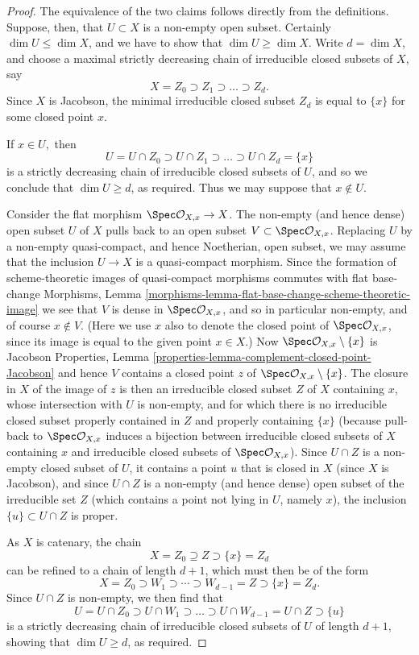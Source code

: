 \begin{proof}
The equivalence of the two claims follows directly from the
definitions.   Suppose, then, that $U\subset X$ is a non-empty open
subset.
Certainly $\dim U \leq \dim X$, and we have to show
that $\dim U \geq \dim X.$
Write $d = \dim X$, and choose a maximal strictly
decreasing chain of irreducible closed subsets
of $X$, say
$$
X = Z_0 \supset Z_1 \supset \dots \supset Z_d.
$$
Since $X$ is Jacobson, the minimal irreducible closed
subset $Z_d$ is equal to $\{x\}$ for some closed
point $x$.

\medskip\noindent
If $x \in U,$ then
$$
U = U \cap Z_0  \supset U\cap Z_1 \supset \dots \supset
U\cap Z_d = \{x\}
$$
is a strictly decreasing chain of irreducible closed
subsets of $U$, and so we conclude that $\dim U \geq d$,
as required.  Thus we may suppose that $x \not\in U.$

\medskip\noindent
Consider the flat morphism $\Spec \mathcal{O}_{X,x} \to X$.
The non-empty (and hence dense) open subset $U$ of $X$
pulls back to an open subset $V \subset \Spec \mathcal{O}_{X,x}$.
Replacing $U$ by a non-empty quasi-compact, and hence
Noetherian, open subset, we may assume that the inclusion
$U \to X$ is a quasi-compact morphism.  Since the
formation of scheme-theoretic images of quasi-compact
morphisms commutes with flat base-change
Morphisms, Lemma
\ref{morphisms-lemma-flat-base-change-scheme-theoretic-image}
we see that $V$ is dense in $\Spec \mathcal{O}_{X,x}$,
and so in particular non-empty,
and of course $x \not\in V.$  (Here we use $x$ also to denote
the closed point of $\Spec \mathcal{O}_{X,x}$, since its image
is equal to the given point $x \in X$.)
Now $\Spec \mathcal{O}_{X,x} \setminus \{x\}$ is Jacobson
Properties, Lemma
\ref{properties-lemma-complement-closed-point-Jacobson}
and hence $V$ contains a closed point $z$
of $\Spec \mathcal{O}_{X,x} \setminus \{x\}$.  The closure
in $X$ of the image of $z$ is then an irreducible
closed subset $Z$ of $X$ containing $x$, whose intersection
with $U$ is non-empty, and
for which there is no irreducible closed
subset properly contained in $Z$
and properly containing $\{x\}$
(because pull-back to $\Spec \mathcal{O}_{X,x}$ induces
a bijection between irreducible closed subsets of $X$
containing $x$ and irreducible closed subsets of $\Spec
\mathcal{O}_{X,x}$).
Since $U \cap Z$ is a non-empty closed subset of $U$,
it contains a point $u$ that is closed in $X$ (since
$X$ is Jacobson), and since $U\cap Z$
is a non-empty (and hence dense) open subset of the irreducible set $Z$
(which contains a point not lying in $U$, namely $x$),
the inclusion $\{u\} \subset U\cap Z$ is proper.

\medskip\noindent
As $X$ is catenary, the chain
$$
X = Z_0 \supseteq Z \supset \{x\} = Z_d
$$
can be refined to a chain of length $d+1$, which must then
be of the form
$$
X = Z_0 \supset W_1 \supset \cdots \supset W_{d-1} = Z \supset \{x\} = Z_d.
$$
Since $U\cap Z$ is non-empty, we then find that
$$
U = U \cap Z_0 \supset U \cap W_1\supset \dots \supset U\cap W_{d-1}
= U\cap Z \supset \{u\}
$$
is a strictly decreasing chain of irreducible closed subsets
of $U$ of length $d+1$, showing that $\dim U \geq d$,
as required.
\end{proof}

